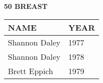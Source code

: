 \begin{table}[H]
\centering
\begin{minipage}[t]{0.6\textwidth}
\centering
\textbf{50 BREAST}\\[0.1cm]
\begin{tabular}{@{}p{2.8cm}p{1.2cm}@{}}
\hline
    \textbf{NAME} & \textbf{YEAR} \\
\hline
    Shannon Daley & 1977 \\
    Shannon Daley & 1978 \\
    Brett Eppich & 1979 \\
\hline
\end{tabular}
\end{minipage}
\end{table}

